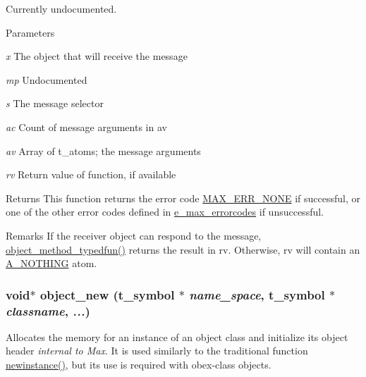 Currently undocumented. 
\begin{DoxyParams}{Parameters}
\item[{\em x}]The object that will receive the message \item[{\em mp}]Undocumented \item[{\em s}]The message selector \item[{\em ac}]Count of message arguments in {\ttfamily av} \item[{\em av}]Array of t\_\-atoms; the message arguments \item[{\em rv}]Return value of function, if available\end{DoxyParams}
\begin{DoxyReturn}{Returns}
This function returns the error code \hyperlink{group__misc_gga0764dd6c02b76cca7d053ae50555d69da6d22f77fef8b1e1b074cef5d29d935fd}{MAX\_\-ERR\_\-NONE} if successful, or one of the other error codes defined in \hyperlink{group__misc_ga0764dd6c02b76cca7d053ae50555d69d}{e\_\-max\_\-errorcodes} if unsuccessful.
\end{DoxyReturn}
\begin{DoxyRemark}{Remarks}
If the receiver object can respond to the message, \hyperlink{group__obj_gaa5ff59d2297a2dde60e3f2fe3e02eceb}{object\_\-method\_\-typedfun()} returns the result in {\ttfamily rv}. Otherwise, {\ttfamily rv} will contain an \hyperlink{group__atom_gga8aa6700e9f00b132eb376db6e39ade47a858ddb5d5927eae3fd699a82c7e174b6}{A\_\-NOTHING} atom. 
\end{DoxyRemark}
\hypertarget{group__obj_gac4b370265c776db4f545d257089af1cf}{
\subsubsection[{object\_\-new}]{\setlength{\rightskip}{0pt plus 5cm}void$\ast$ object\_\-new ({\bf t\_\-symbol} $\ast$ {\em name\_\-space}, \/  {\bf t\_\-symbol} $\ast$ {\em classname}, \/   {\em ...})}}
\label{group__obj_gac4b370265c776db4f545d257089af1cf}


Allocates the memory for an instance of an object class and initialize its object header {\itshape internal to Max\/}. It is used similarly to the traditional function \hyperlink{group__class__old_ga4c1f100a92d6f519ba4e93665ff54998}{newinstance()}, but its use is required with obex-\/class objects.


